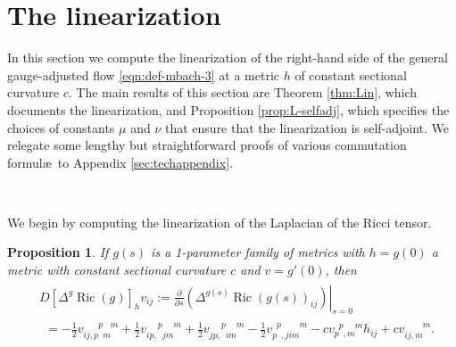 \documentclass[10pt,reqno]{amsart}
\newtheorem{prop}[theorem]{Proposition}
\DeclareMathOperator{\Ric}{Ric}
\newcommand{\vdddu}[4]{v_{#1 #2, #3}^{\phantom{#1#2,#3} #4}}
\newcommand{\vdudu}[4]{v_{#1 \phantom{#2}, #3 \phantom{#4}}^{\phantom{#1} #2 \phantom{, #3} #4}}
\newcommand{\vdddudu}[6]{v_{#1#2,#3\phantom{#4}#5\phantom{#6}}^{\phantom{#1#2,#3}#4\phantom{#5}#6}}
\newcommand{\vdduddu}[6]{v_{#1#2,\phantom{#3}#4#5\phantom{#6}}^{\phantom{#1#2,}#3\phantom{#4#5}#6}}
\newcommand{\vdudddu}[6]{v_{#1\phantom{#2},#3#4#5\phantom{#6}}^{\phantom{#1}#2\phantom{,#3#4#5}#6}}
\begin{document}
\section{The linearization} \label{sec:linearize}
In this section we compute the linearization of the right-hand side of the general gauge-adjusted flow \eqref{eqn:def-mbach-3} at a metric $h$ of constant 
sectional curvature $c$.  The main results of this section are Theorem \ref{thm:Lin}, which documents the linearization, and Proposition \ref{prop:L-selfadj}, which 
specifies the choices of constants $\mu$ and $\nu$ that ensure that the linearization is self-adjoint. We relegate some lengthy but straightforward proofs of 
various commutation formul\ae\ to Appendix \ref{sec:techappendix}.

\

We begin by computing the linearization of the Laplacian of the Ricci tensor.
\begin{prop}
If $g(s)$ is a 1-parameter family of metrics with $h = g(0)$ a metric with constant sectional curvature $c$ and $v = g'(0)$, then 
\begin{align} \label{eqn:lin-tensor}
\begin{aligned}
& D[ \Delta^g \Ric(g) ]_h v_{ij} := \left. \frac{\partial}{\partial s} ( \Delta^{g(s)} \Ric(g(s))_{ij} )\right|_{s=0} \\
&\ \ = -\frac{1}{2} \vdddudu{i}{j}{p}{p}{m}{m}
  + \frac{1}{2} \vdduddu{i}{p}{p}{j}{m}{m} + \frac{1}{2} \vdduddu{j}{p}{p}{i}{m}{m} - \frac{1}{2} \vdudddu{p}{p}{j}{i}{m}{m} - c \vdudu{p}{p}{m}{m} h_{ij} + 
c \vdddu{i}{j}{m}{m}. 
\end{aligned}
\end{align}
\end{prop}
\end{document}
